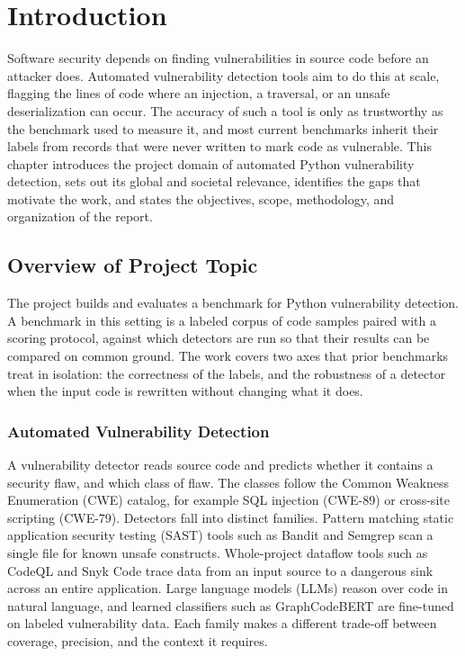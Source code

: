 \chapter{Introduction}
\label{ch:intro}

Software security depends on finding vulnerabilities in source code before an
attacker does. Automated vulnerability detection tools aim to do this at scale,
flagging the lines of code where an injection, a traversal, or an unsafe
deserialization can occur. The accuracy of such a tool is only as trustworthy
as the benchmark used to measure it, and most current benchmarks inherit their
labels from records that were never written to mark code as vulnerable. This
chapter introduces the project domain of automated Python vulnerability
detection, sets out its global and societal relevance, identifies the gaps that
motivate the work, and states the objectives, scope, methodology, and
organization of the report.


\section{Overview of Project Topic}

The project builds and evaluates a benchmark for Python vulnerability
detection. A benchmark in this setting is a labeled corpus of code samples
paired with a scoring protocol, against which detectors are run so that their
results can be compared on common ground. The work covers two axes that prior
benchmarks treat in isolation: the correctness of the labels, and the
robustness of a detector when the input code is rewritten without changing what
it does.

\subsection{Automated Vulnerability Detection}

A vulnerability detector reads source code and predicts whether it contains a
security flaw, and which class of flaw. The classes follow the Common
Weakness Enumeration (CWE) catalog, for example SQL injection (CWE-89) or
cross-site scripting (CWE-79). Detectors fall into distinct families. Pattern
matching static application security testing (SAST) tools such as Bandit and
Semgrep scan a single file for known unsafe constructs. Whole-project dataflow
tools such as CodeQL and Snyk Code trace data from an input source to a
dangerous sink across an entire application. Large language models (LLMs)
reason over code in natural language, and learned classifiers such as
GraphCodeBERT are fine-tuned on labeled vulnerability data. Each family makes a
different trade-off between coverage, precision, and the context it requires.

